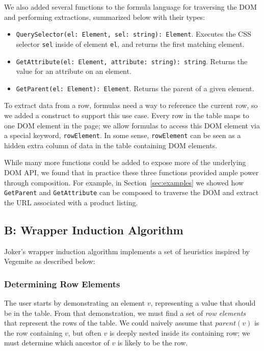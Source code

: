 \documentclass[sigconf,10pt]{acmart}
\providecommand{\tightlist}{%
  \setlength{\itemsep}{0pt}\setlength{\parskip}{0pt}}
\begin{document}
We also added several functions to the formula language for traversing
the DOM and performing extractions, summarized below with their types:

\begin{itemize}
\tightlist
\item
  \texttt{QuerySelector(el:\ Element,\ sel:\ string):\ Element}.
  Executes the CSS selector \texttt{sel} inside of element \texttt{el},
  and returns the first matching element.
\item
  \texttt{GetAttribute(el:\ Element,\ attribute:\ string):\ string}.
  Returns the value for an attribute on an element.
\item
  \texttt{GetParent(el:\ Element):\ Element}. Returns the parent of a
  given element.
\end{itemize}

To extract data from a row, formulas need a way to reference the current
row, so we added a construct to support this use case. Every row in the
table maps to one DOM element in the page; we allow formulas to access
this DOM element via a special keyword, \texttt{rowElement}. In some
sense, \texttt{rowElement} can be seen as a hidden extra column of data
in the table containing DOM elements.

While many more functions could be added to expose more of the
underlying DOM API, we found that in practice these three functions
provided ample power through composition. For example, in
Section~\ref{sec:examples} we showed how \texttt{GetParent} and
\texttt{GetAttribute} can be composed to traverse the DOM and extract
the URL associated with a product listing.

\hypertarget{appendix-b}{%
\subsection*{B: Wrapper Induction Algorithm}\label{appendix-b}}

Joker's wrapper induction algorithm implements a set of heuristics inspired by Vegemite
as described below:

\hypertarget{determining-row-elements}{%
\subsubsection*{Determining Row
Elements}\label{determining-row-elements}}

The user starts by demonstrating an element \(v\), representing a value
that should be in the table. From that demonstration, we must find a set
of \emph{row elements} that represent the rows of the table. We could
naively assume that \(parent(v)\) is the row containing \(v\), but often
\(v\) is deeply nested inside its containing row; we must determine
which ancestor of \(v\) is likely to be the row.
\end{document}

